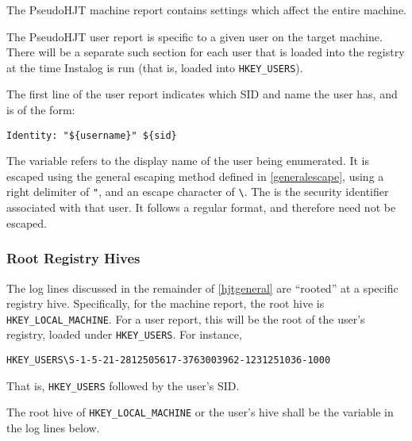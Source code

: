 The PseudoHJT machine report contains settings which affect the entire machine.

The PseudoHJT user report is specific to a given user on the target machine.
There will be a separate such section for each user that is loaded into the
registry at the time Instalog is run (that is, loaded into \verb|HKEY_USERS|).

The first line of the user report indicates which SID and name the user has, and
is of the form:
\begin{verbatim}
Identity: "${username}" ${sid}
\end{verbatim}

The variable  refers to the display name of the user being
enumerated. It is escaped using the general escaping method defined in
\ref{generalescape}, using a right delimiter of \verb|"|, and an escape
character of \verb|\|. The  is the security identifier associated with
that user. It follows a regular format, and therefore need not be escaped.

\subsubsection{Root Registry Hives}
The log lines discussed in the remainder of \ref{hjtgeneral} are ``rooted'' at a
specific registry hive. Specifically, for the machine report, the root hive is
\verb|HKEY_LOCAL_MACHINE|. For a user report, this will be the root of the
user's registry, loaded under \verb|HKEY_USERS|. For instance,
\begin{verbatim}
HKEY_USERS\S-1-5-21-2812505617-3763003962-1231251036-1000
\end{verbatim}
That is, \verb|HKEY_USERS| followed by the user's SID.

The root hive of \verb|HKEY_LOCAL_MACHINE| or the user's hive shall be
the variable  in the log lines below.


